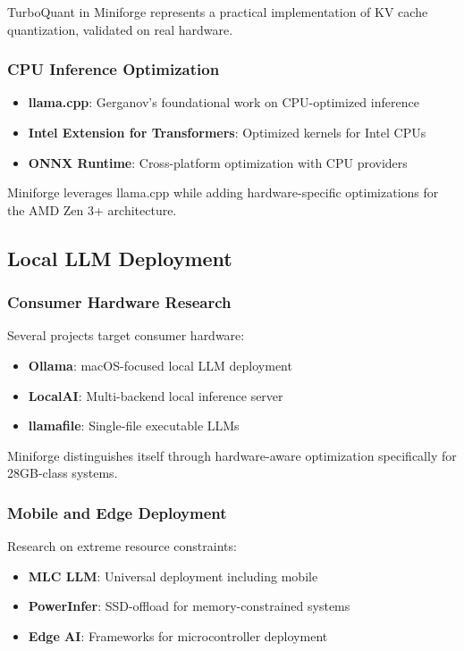 TurboQuant in Miniforge represents a practical implementation of KV cache quantization, validated on real hardware.

\subsubsection{CPU Inference Optimization}

\begin{itemize}
    \item \textbf{llama.cpp}: Gerganov's foundational work on CPU-optimized inference \cite{ggerganov2023llama}
    \item \textbf{Intel Extension for Transformers}: Optimized kernels for Intel CPUs
    \item \textbf{ONNX Runtime}: Cross-platform optimization with CPU providers
\end{itemize}

Miniforge leverages llama.cpp while adding hardware-specific optimizations for the AMD Zen 3+ architecture.

\subsection{Local LLM Deployment}

\subsubsection{Consumer Hardware Research}

Several projects target consumer hardware:

\begin{itemize}
    \item \textbf{Ollama}: macOS-focused local LLM deployment
    \item \textbf{LocalAI}: Multi-backend local inference server
    \item \textbf{llamafile}: Single-file executable LLMs
\end{itemize}

Miniforge distinguishes itself through hardware-aware optimization specifically for 28GB-class systems.

\subsubsection{Mobile and Edge Deployment}

Research on extreme resource constraints:

\begin{itemize}
    \item \textbf{MLC LLM}: Universal deployment including mobile
    \item \textbf{PowerInfer}: SSD-offload for memory-constrained systems
    \item \textbf{Edge AI}: Frameworks for microcontroller deployment
\end{itemize}

